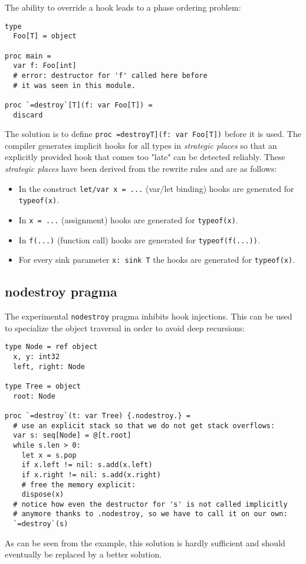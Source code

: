The ability to override a hook leads to a phase ordering problem:

\begin{verbatim}
type
  Foo[T] = object

proc main =
  var f: Foo[int]
  # error: destructor for 'f' called here before
  # it was seen in this module.

proc `=destroy`[T](f: var Foo[T]) =
  discard
\end{verbatim}

The solution is to define
\texttt{proc\ \textasciigrave{}=destroy\textasciigrave{}{[}T{]}(f:\ var\ Foo{[}T{]})}
before it is used. The compiler generates implicit hooks for all types
in \emph{strategic places} so that an explicitly provided hook that
comes too "late" can be detected reliably. These \emph{strategic places}
have been derived from the rewrite rules and are as follows:

\begin{itemize}
\tightlist
\item
  In the construct \texttt{let/var\ x\ =\ ...} (var/let binding) hooks
  are generated for \texttt{typeof(x)}.
\item
  In \texttt{x\ =\ ...} (assignment) hooks are generated for
  \texttt{typeof(x)}.
\item
  In \texttt{f(...)} (function call) hooks are generated for
  \texttt{typeof(f(...))}.
\item
  For every sink parameter \texttt{x:\ sink\ T} the hooks are generated
  for \texttt{typeof(x)}.
\end{itemize}

\hypertarget{nodestroy-pragma}{%
\subsection{nodestroy pragma}\label{nodestroy-pragma}}

The experimental \texttt{nodestroy} pragma inhibits hook injections.
This can be used to specialize the object traversal in order to avoid
deep recursions:

\begin{verbatim}
type Node = ref object
  x, y: int32
  left, right: Node

type Tree = object
  root: Node

proc `=destroy`(t: var Tree) {.nodestroy.} =
  # use an explicit stack so that we do not get stack overflows:
  var s: seq[Node] = @[t.root]
  while s.len > 0:
    let x = s.pop
    if x.left != nil: s.add(x.left)
    if x.right != nil: s.add(x.right)
    # free the memory explicit:
    dispose(x)
  # notice how even the destructor for 's' is not called implicitly
  # anymore thanks to .nodestroy, so we have to call it on our own:
  `=destroy`(s)
\end{verbatim}

As can be seen from the example, this solution is hardly sufficient and
should eventually be replaced by a better solution.
